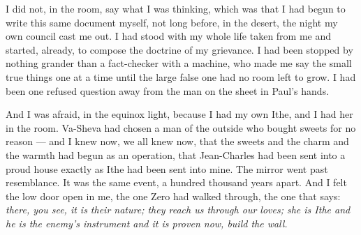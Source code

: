 I did not, in the room, say what I was thinking, which was that I had begun to write this same document myself, not long before, in the desert, the night my own council cast me out. I had stood with my whole life taken from me and started, already, to compose the doctrine of my grievance. I had been stopped by nothing grander than a fact-checker with a machine, who made me say the small true things one at a time until the large false one had no room left to grow. I had been one refused question away from the man on the sheet in Paul's hands.\par

And I was afraid, in the equinox light, because I had my own Ithe, and I had her in the room. Va-Sheva had chosen a man of the outside who bought sweets for no reason --- and I knew now, we all knew now, that the sweets and the charm and the warmth had begun as an operation, that Jean-Charles had been sent into a proud house exactly as Ithe had been sent into mine. The mirror went past resemblance. It was the same event, a hundred thousand years apart. And I felt the low door open in me, the one Zero had walked through, the one that says: \emph{there, you see, it is their nature; they reach us through our loves; she is Ithe and he is the enemy's instrument and it is proven now, build the wall.}\par

\ornament

